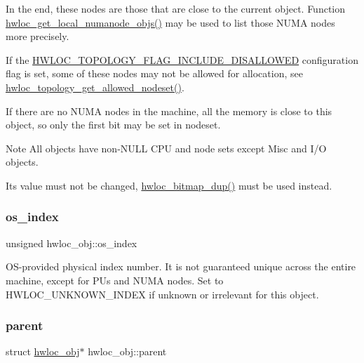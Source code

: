 In the end, these nodes are those that are close to the current object. Function \hyperlink{a00211_ga569e80c5be7ef27649b0ef5aa52ffcdc}{hwloc\+\_\+get\+\_\+local\+\_\+numanode\+\_\+objs()} may be used to list those N\+U\+MA nodes more precisely.

If the \hyperlink{a00193_ggada025d3ec20b4b420f8038d23d6e7bdea10907044bbb306fd0dc76acf046d9258}{H\+W\+L\+O\+C\+\_\+\+T\+O\+P\+O\+L\+O\+G\+Y\+\_\+\+F\+L\+A\+G\+\_\+\+I\+N\+C\+L\+U\+D\+E\+\_\+\+D\+I\+S\+A\+L\+L\+O\+W\+ED} configuration flag is set, some of these nodes may not be allowed for allocation, see \hyperlink{a00202_ga21a4d7237a11e76b912ed4524ab78cbd}{hwloc\+\_\+topology\+\_\+get\+\_\+allowed\+\_\+nodeset()}.

If there are no N\+U\+MA nodes in the machine, all the memory is close to this object, so only the first bit may be set in {\ttfamily nodeset}.

\begin{DoxyNote}{Note}
All objects have non-\/\+N\+U\+LL C\+PU and node sets except Misc and I/O objects.

Its value must not be changed, \hyperlink{a00205_gae679434c1a5f41d3560a8a7e2c1b0dee}{hwloc\+\_\+bitmap\+\_\+dup()} must be used instead. 
\end{DoxyNote}
\mbox{\label{a00238_a61a7a80a68eaccbaaa28269e678c81a9}} 
\subsubsection{\texorpdfstring{os\+\_\+index}{os\_index}}
{\footnotesize\ttfamily unsigned hwloc\+\_\+obj\+::os\+\_\+index}



O\+S-\/provided physical index number. It is not guaranteed unique across the entire machine, except for P\+Us and N\+U\+MA nodes. Set to H\+W\+L\+O\+C\+\_\+\+U\+N\+K\+N\+O\+W\+N\+\_\+\+I\+N\+D\+EX if unknown or irrelevant for this object. 

\mbox{\label{a00238_adc494f6aed939992be1c55cca5822900}} 
\subsubsection{\texorpdfstring{parent}{parent}}
{\footnotesize\ttfamily struct \hyperlink{a00238}{hwloc\+\_\+obj}$\ast$ hwloc\+\_\+obj\+::parent}



